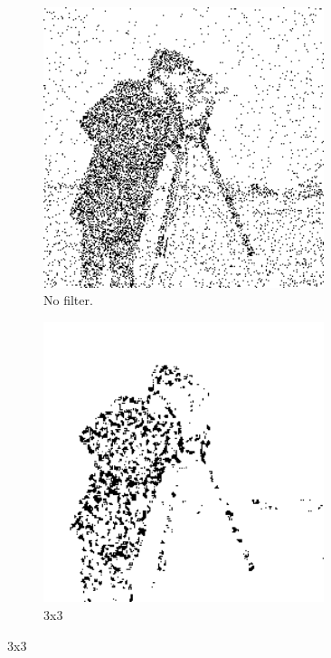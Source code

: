 \begin{figure}[h]
    \centering

    \begin{subfigure}[b]{0.3\textwidth}
        \includegraphics[width=0.9\textwidth]{../code/2_out/2-1_gaus.png}
        \caption{No filter.}
        \label{fig:2-2-2:1}
    \end{subfigure}
    \begin{subfigure}[b]{0.3\textwidth}
        \includegraphics[width=0.9\textwidth]{../code/2_out/2-2_gaus_3x3.png}
        \caption{3x3}
        \label{fig:2-2-2:2}
    \end{subfigure}


\end{figure}
